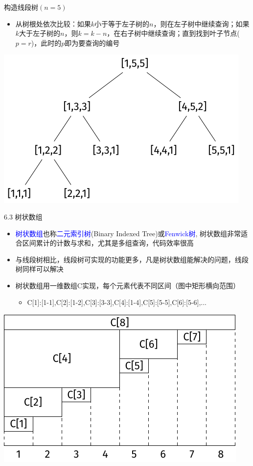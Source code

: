\begin{frame}{构造线段树$(n=5)$}
    \begin{itemize}
        \item  从树根处依次比较：如果$k$小于等于左子树的$n$，则在左子树中继续查询；如果$k$大于左子树的$n$，则$k=k-n$，在右子树中继续查询；直到找到叶子节点($p=r$)，此时的$p$即为要查询的编号
    \end{itemize}
    \includegraphics[center]{fig/6-3.pdf}
\end{frame}
\begin{frame}{6.3 树状数组}
    \begin{itemize}
        \item \textcolor{blue}{树状数组}也称\textcolor{blue}{二元索引树}(Binary Indexed Tree)或\textcolor{blue}{Fenwick树}, 树状数组非常适合区间累计的计数与求和，尤其是多组查询，代码效率很高
        \item 与线段树相比，线段树可实现的功能更多，凡是树状数组能解决的问题，线段树同样可以解决
        \item 树状数组用一维数组C实现，每个元素代表不同区间（图中矩形横向范围）
        \begin{itemize}
            \item C[1]:[1-1],C[2]:[1-2],C[3]:[3-3],C[4]:[1-4],C[5]:[5-5],C[6]:[5-6],...
        \end{itemize}
    \end{itemize}
    \includegraphics[scale=.7,center]{fig/6-4.pdf}
\end{frame}
